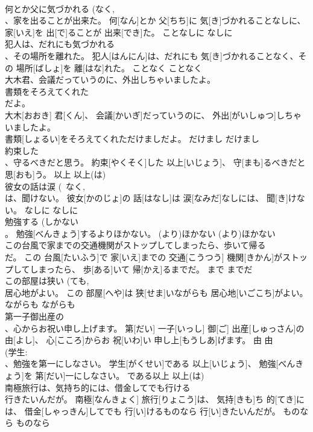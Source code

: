 \documentclass[8pt]{extreport}
\begin{document}
\begin{CJK}{UTF8}{min}
\\	何とか父に気づかれる (なく, 
\\	、家を出ることが出来た。	何[なん]とか 父[ちち]に 気[き]づかれることなしに、 家[いえ]を 出[で]ることが 出来[でき]た。	ことなしに	なしに	
\\	犯人は、だれにも気づかれる 
\\	、その場所を離れた。	犯人[はんにん]は、だれにも 気[き]づかれることなく、その 場所[ばしょ]を 離[はな]れた。	ことなく	ことなく	
\\	大木君、会議だっていうのに、外出しちゃいましたよ。
\\	書類をそろえてくれた 
\\	だよ。	
\\	大木[おおき] 君[くん]、 会議[かいぎ]だっていうのに、 外出[がいしゅつ]しちゃいましたよ。
\\	書類[しょるい]をそろえてくれただけましだよ。	だけまし	だけまし	
\\	約束した 
\\	、守るべきだと思う。	約束[やくそく]した 以上[いじょう]、 守[まも]るべきだと 思[おも]う。	以上	以上(は)	
\\	彼女の話は涙 (~なく, 
\\	は、聞けない。	彼女[かのじょ]の 話[はなし]は 涙[なみだ]なしには、 聞[き]けない。	なしに	なしに	
\\	勉強する (しかない 
\\	。	勉強[べんきょう]するよりほかない。	(より)ほかない	(より)ほかない	
\\	この台風で家までの交通機関がストップしてしまったら、歩いて帰る 
\\	だ。	この 台風[たいふう]で 家[いえ]までの 交通[こうつう] 機関[きかん]がストップしてしまったら、 歩[ある]いて 帰[かえ]るまでだ。	まで	までだ	
\\	この部屋は狭い (ても, 
\\	居心地がよい。	この 部屋[へや]は 狭[せま]いながらも 居心地[いごこち]がよい。	ながらも	ながらも	
\\	第一子御出産の 
\\	、心からお祝い申し上げます。	第[だい] 一子[いっし] 御[ご] 出産[しゅっさん]の 由[よし]、 心[こころ]からお 祝[いわ]い 申し上[もうしあ]げます。	由	由	
\\	(学生:
\\	、勉強を第一にしなさい。	学生[がくせい]である 以上[いじょう]、 勉強[べんきょう]を 第[だい]一にしなさい。	である以上	以上(は)	
\\	南極旅行は、気持ち的には、借金してでも行ける 
\\	行きたいんだが。	南極[なんきょく] 旅行[りょこう]は、 気持[きも]ち 的[てき]には、 借金[しゃっきん]してでも 行[い]けるものなら 行[い]きたいんだが。	ものなら	ものなら	

\end{CJK}
\end{document}
